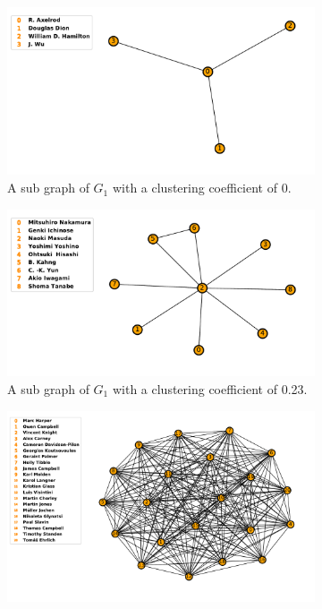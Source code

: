\documentclass{article}
\theoremstyle{definition}
\begin{document}
\begin{center}
    \begin{figure}[!hbtp]
        \begin{subfigure}{0.33\textwidth}
            \includegraphics[width=\textwidth]{./assets/images/clustering_example_one.pdf}
            \caption{A sub graph of \(G_1\) with a clustering coefficient of 0.}
        \end{subfigure}
        \begin{subfigure}{0.33\textwidth}
            \includegraphics[width=\textwidth]{./assets/images/clustering_example_two.pdf}
            \caption{A sub graph of \(G_1\) with a clustering coefficient of 0.23.}
        \end{subfigure}
        \begin{subfigure}{0.33\textwidth}
            \includegraphics[width=\textwidth]{./assets/images/clustering_example_three.pdf}

\end{subfigure}
\end{figure}
\end{center}
\end{document}

